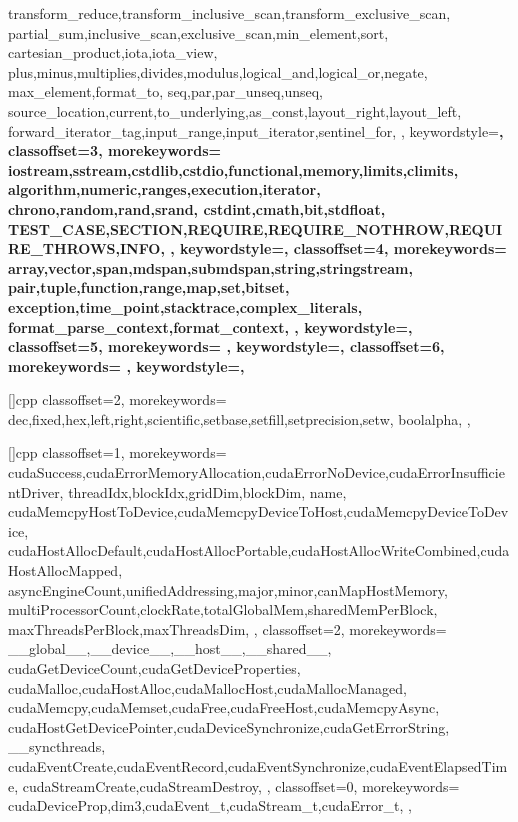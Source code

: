 {{    transform_reduce,transform_inclusive_scan,transform_exclusive_scan,
    partial_sum,inclusive_scan,exclusive_scan,min_element,sort,
    cartesian_product,iota,iota_view,
    plus,minus,multiplies,divides,modulus,logical_and,logical_or,negate,
    max_element,format_to,
    seq,par,par_unseq,unseq,
    source_location,current,to_underlying,as_const,layout_right,layout_left,
    forward_iterator_tag,input_range,input_iterator,sentinel_for,
  },
  keywordstyle=\bfseries\color{jade},
  classoffset=3,
  morekeywords={
    iostream,sstream,cstdlib,cstdio,functional,memory,limits,climits,
    algorithm,numeric,ranges,execution,iterator,
    chrono,random,rand,srand,
    cstdint,cmath,bit,stdfloat,
    TEST_CASE,SECTION,REQUIRE,REQUIRE_NOTHROW,REQUIRE_THROWS,INFO,
  },
  keywordstyle=\bfseries\color{green!40!blue!60},
  classoffset=4,
  morekeywords={
    array,vector,span,mdspan,submdspan,string,stringstream,
    pair,tuple,function,range,map,set,bitset,
    exception,time_point,stacktrace,complex_literals,
    format_parse_context,format_context,
  },
  keywordstyle=\bfseries\color{amethyst},
  classoffset=5,
  morekeywords={
  },
  keywordstyle=\bfseries\color{green!40!red!60},
  classoffset=6,
  morekeywords={
  },
  keywordstyle=\bfseries\color{lavender(floral)},
}
\newcommand\lstcstd[1]{\lstinline{std::#1}}

[]{cpp}{
  classoffset=2,
  morekeywords={
    dec,fixed,hex,left,right,scientific,setbase,setfill,setprecision,setw,
    boolalpha,
  },
}

[]{cpp}{
  classoffset=1,
  morekeywords={
    cudaSuccess,cudaErrorMemoryAllocation,cudaErrorNoDevice,cudaErrorInsufficientDriver,
    threadIdx,blockIdx,gridDim,blockDim,
    name,
    cudaMemcpyHostToDevice,cudaMemcpyDeviceToHost,cudaMemcpyDeviceToDevice,
    cudaHostAllocDefault,cudaHostAllocPortable,cudaHostAllocWriteCombined,cudaHostAllocMapped,
    asyncEngineCount,unifiedAddressing,major,minor,canMapHostMemory,
    multiProcessorCount,clockRate,totalGlobalMem,sharedMemPerBlock,
    maxThreadsPerBlock,maxThreadsDim,
  },
  classoffset=2,
  morekeywords={
    __global__,__device__,__host__,__shared__,
    cudaGetDeviceCount,cudaGetDeviceProperties,
    cudaMalloc,cudaHostAlloc,cudaMallocHost,cudaMallocManaged,
    cudaMemcpy,cudaMemset,cudaFree,cudaFreeHost,cudaMemcpyAsync,
    cudaHostGetDevicePointer,cudaDeviceSynchronize,cudaGetErrorString,
    __syncthreads,
    cudaEventCreate,cudaEventRecord,cudaEventSynchronize,cudaEventElapsedTime,
    cudaStreamCreate,cudaStreamDestroy,
  },
  classoffset=0,
  morekeywords={
    cudaDeviceProp,dim3,cudaEvent_t,cudaStream_t,cudaError_t,
  },
}

